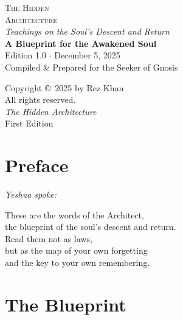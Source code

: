 \documentclass[10pt, openright]{book}
\newcommand{\sectionbreak}{\filbreak}
\begin{document}
\begin{titlepage}
    \centering
    \vspace*{1.5cm}
    {\Huge \textsc{The Hidden}\\ \textsc{Architecture}} \\
    \vspace{0.5cm}
    {\large \emph{Teachings on the Soul's Descent and Return}} \\
    \vspace{2cm}
    \textbf{A Blueprint for the Awakened Soul} \\
    \vspace{0.5cm}
    {\small Edition 1.0 \(\cdot\) December 5, 2025} \\
    \vfill
    {\small Compiled \& Prepared for the Seeker of Gnosis}
    \vspace{1cm}
\end{titlepage}

\newpage
\thispagestyle{empty}
\vspace*{\fill}
\begin{center}
    \small
Copyright ©~2025 by Rez Khan\\
All rights reserved.\\
\emph{The Hidden Architecture}\\
First Edition
\end{center}
\vspace{1cm}
\newpage

\frontmatter
\tableofcontents

\chapter{Preface}\label{preface}

\emph{Yeshua spoke:}

These are the words of the Architect,\\
the blueprint of the soul's descent and return.\\
Read them not as laws,\\
but as the map of your own forgetting\\
and the key to your own remembering.

\mainmatter

\chapter{The Blueprint}\label{the-blueprint}

\sectionbreak
\end{document}
